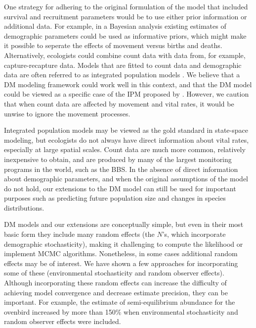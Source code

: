 \documentclass[12pt,english]{article}
\begin{document}
\begin{spacing}{1.9}
\begin{flushleft}
One strategy for adhering to the original formulation of the
model that included survival and recruitment parameters would be to
use either prior information or additional data. For example, in a
Bayesian analysis existing estimates of demographic parameters
could be used as informative priors, which might make it possible to
seperate the effects of movement versus births and deaths.
Alternatively, ecologists could combine count data with data
from, for example,
capture-recapture data. Models that are fitted to count data and
demographic data are often referred to as integrated population models
\citep[IPM;][]{besbeas_etal:2002,
buckland_etal:2004,schaub_etal:2007}.
We believe that a DM modeling framework could work well in this context,
and that the DM model could be viewed as a specific case of the
IPM proposed by \citet{buckland_etal:2004}.
However, we caution that when count data are affected by
movement and vital rates, it would be unwise to ignore the movement
processes.

Integrated population models may be viewed as the gold standard in
state-space modeling, but ecologists do not always have direct
information about vital rates, especially at large spatial scales.
Count data are much more common, relatively inexpensive to obtain, and
are produced by many of the largest monitoring programs in the
world, such as the BBS. 
In the absence of direct information about demographic parameters, and
when the original assumptions of the model do not hold, our extensions to the
DM model can still be used for important purposes such as predicting future
population size and changes in species distributions.

DM models and our extensions are conceptually simple, but even in
their most basic form they include many random effects (the $N$'s, which
incorporate demographic stochasticity), making it challenging to compute the likelihood 
or implement MCMC algorithms. Nonetheless, in some cases additional random effects
may be of interest.  We have shown a few approaches for incorporating some of these
(environmental stochasticity and random observer effects).  
Although incorporating these random effects can increase
the difficulty of achieving model convergence and decrease estimate precision, they can be important.
For example, the estimate of semi-equilibrium abundance for the ovenbird increased by more than 150\%
when environmental stochasticity and random observer effects were included.  


\end{flushleft}
\end{spacing}
\end{document}
